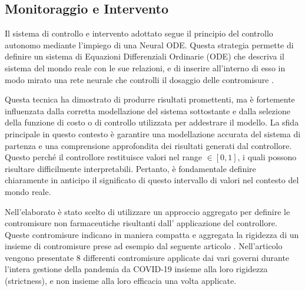 \subsection{Monitoraggio e Intervento}
Il sistema di controllo e intervento adottato segue il principio 
del controllo autonomo mediante l'impiego di una Neural ODE. 
Questa strategia permette di definire un sistema di Equazioni 
Differenziali Ordinarie (ODE) che descriva il sistema del mondo 
reale con le sue relazioni, e di inserire all'interno di esso in 
modo mirato una rete neurale che controlli il dosaggio delle 
contromisure \cite{B_ttcher_2022} \cite{innes2019differentiable} 
\cite{sandoval2022neural}.

Questa tecnica ha dimostrato di produrre risultati promettenti, 
ma è fortemente influenzata dalla corretta modellazione del sistema 
sottostante e dalla selezione della funzione di costo o di controllo 
utilizzata per addestrare il modello. La sfida principale in questo 
contesto è garantire una modellazione accurata del sistema di 
partenza e una comprensione approfondita dei risultati generati 
dal controllore. Questo perché il controllore restituisce valori 
nel range $\in [0, 1]$, i quali possono risultare difficilmente 
interpretabili. Pertanto, è fondamentale definire chiaramente in 
anticipo il significato di questo intervallo di valori nel contesto 
del mondo reale.

Nell'elaborato è stato scelto di utilizzare un approccio aggregato 
per definire le contromisure non farmaceutiche risultanti dall'
applicazione del controllore. Queste contromisure indicano in 
maniera compatta e aggregata la rigidezza di un insieme di 
contromisure prese ad esempio dal seguente articolo \cite{Hale2021}.
Nell'articolo vengono presentate 8 differenti contromisure applicate
dai vari governi durante l'intera gestione della pandemia da COVID-19
insieme alla loro rigidezza (strictness), e non insieme alla loro 
efficacia una volta applicate. 

